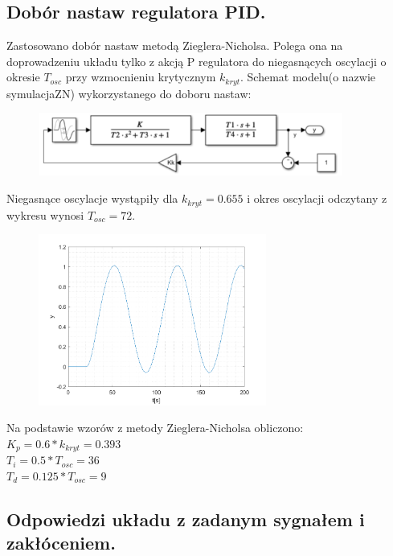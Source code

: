 \documentclass[a4paper]{article}
\begin{document}
\subsection{Dobór nastaw regulatora PID.}
Zastosowano dobór nastaw metodą Zieglera-Nicholsa. Polega ona na doprowadzeniu układu tylko z akcją P regulatora do niegasnących oscylacji o okresie $T_{osc}$ przy wzmocnieniu krytycznym $k_{kryt}$.
Schemat modelu(o nazwie symulacjaZN) wykorzystanego do doboru nastaw:
\begin{figure}[H]
	\centering
	\includegraphics[width=10cm]{modelsymulacjaZN} 
\end{figure}
Niegasnące oscylacje wystąpiły dla $k_{kryt}=0.655$ i okres oscylacji odczytany z wykresu wynosi $T_{osc}=72$.
\begin{figure}[H]
	\centering
	\includegraphics[width=7.5cm]{pkt4} 
\end{figure}
Na podstawie wzorów z metody Zieglera-Nicholsa obliczono: \\
$K_p=0.6*k_{kryt}=0.393$ \\
$T_i=0.5*T_{osc}=36$ \\
$T_d=0.125*T_{osc}=9$ \\

\subsection{Odpowiedzi układu z zadanym sygnałem i zakłóceniem.}
\end{document}
